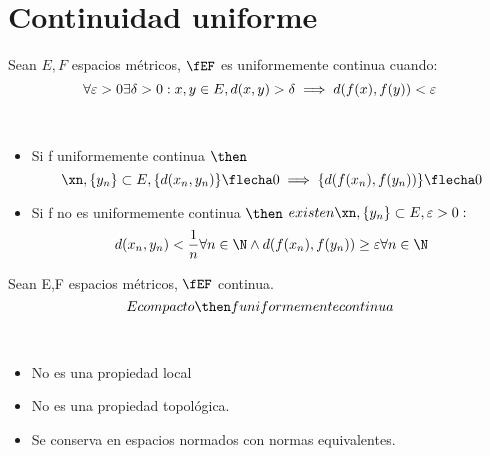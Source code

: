 \section{Continuidad uniforme}

\begin{definicion}
    Sean $E,F$ espacios métricos, $\fEF$ es uniformemente continua cuando:
    $$\forall \varepsilon > 0 \\\exists \delta >0: x,y \in E, d(x,y) > \delta \implies d(f(x),f(y)) < \varepsilon$$
\end{definicion}

\begin{prop}[Caracterización] \\
    \begin{itemize}
        \item Si f uniformemente continua $\then$
        $$\xn, \{y_n\} \subset E, \{d(x_n,y_n)\} \flecha 0 \implies \{d(f(x_n),f(y_n))\} \flecha 0$$
        \item Si f no es uniformemente continua $\then$
        $existen \\ \xn, \{y_n\} \subset E, \varepsilon > 0 :$
        $$d (x_n,y_n) < \frac{1}{n} \\\forall n \in \N \\\land\\ d(f(x_n),f(y_n)) \geq \varepsilon \\\forall n \in \N$$
    \end{itemize}    
\end{prop}

\begin{teo}[Heine]
    Sean E,F espacios métricos, $\fEF$ continua.
    $$E \\ compacto \then f \\ uniformemente \\ continua$$
\end{teo}

\begin{observacion}\\
    \begin{itemize}
        \item No es una propiedad local
        \item No es una propiedad topológica.
        \item Se conserva en espacios normados con normas equivalentes.
    \end{itemize}
\end{observacion}

